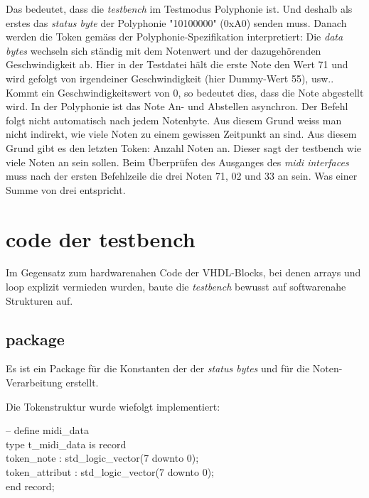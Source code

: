 Das bedeutet, dass die \textit{testbench} im Testmodus Polyphonie ist. Und deshalb als erstes das \textit{status byte} der Polyphonie "10100000" (0xA0) senden muss. Danach werden die Token gemäss der Polyphonie-Spezifikation interpretiert: Die \textit{data bytes} wechseln sich ständig mit dem Notenwert und der dazugehörenden Geschwindigkeit ab. Hier in der Testdatei hält die erste Note den Wert 71 und wird gefolgt von irgendeiner Geschwindigkeit (hier Dummy-Wert 55), usw.. Kommt ein Geschwindigkeitswert von 0, so bedeutet dies, dass die Note abgestellt wird.
In der Polyphonie ist das Note An- und Abstellen asynchron. Der Befehl folgt nicht automatisch nach jedem Notenbyte. Aus diesem Grund weiss man nicht indirekt, wie viele Noten zu einem gewissen Zeitpunkt an sind. Aus diesem Grund gibt es den letzten Token: Anzahl Noten an. Dieser sagt der testbench wie viele Noten an sein sollen.
Beim Überprüfen des Ausganges des \textit{midi interfaces} muss nach der ersten Befehlzeile die drei Noten 71, 02 und 33 an sein. Was einer Summe von drei entspricht.







\section{code der testbench}\label{sec.code_testbench}
Im Gegensatz zum hardwarenahen Code der VHDL-Blocks, bei denen arrays und loop explizit vermieden wurden, baute die \textit{testbench} bewusst auf softwarenahe Strukturen auf.

\subsection*{package}
Es ist ein Package für die Konstanten der der \textit{status bytes} und für die Noten-Verarbeitung erstellt.
\smallskip

Die Tokenstruktur wurde wiefolgt implementiert: \\  
\smallskip 

-- define midi\_data\\
type t\_midi\_data is record  \\                    
\hspace*{12mm}        token\_note : std\_logic\_vector(7 downto 0);  \\                  
\hspace*{12mm}        token\_attribut : std\_logic\_vector(7 downto 0);\\
\hspace*{12mm}    end record;\\

